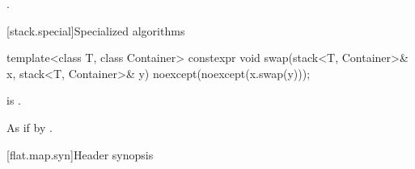 \begin{itemdescr}
\pnum
\returns
{}.
\end{itemdescr}

[stack.special]{Specialized algorithms}

%
\begin{itemdecl}
template<class T, class Container>
  constexpr void swap(stack<T, Container>& x, stack<T, Container>& y)
    noexcept(noexcept(x.swap(y)));
\end{itemdecl}

\begin{itemdescr}
\pnum
\constraints
{} is .

\pnum
\effects
As if by .
\end{itemdescr}

[flat.map.syn]{Header  synopsis}

